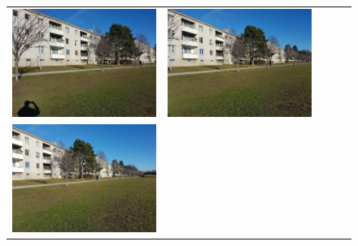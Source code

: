 \begin{figure}[h]
\begin{tabular}{ccccc}
	\includegraphics[width=\mywidth]{figures/seriesC_4.jpg} &
	\includegraphics[width=\mywidth]{figures/seriesC_3.jpg} \\
	\includegraphics[width=\mywidth]{figures/seriesC_2.jpg} &

\end{tabular}
\end{figure}
